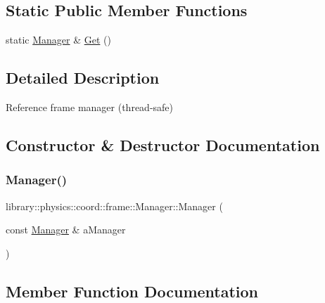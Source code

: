\subsection*{Static Public Member Functions}
\begin{DoxyCompactItemize}
\item 
static \hyperlink{classlibrary_1_1physics_1_1coord_1_1frame_1_1_manager}{Manager} \& \hyperlink{classlibrary_1_1physics_1_1coord_1_1frame_1_1_manager_ab17540188339548c7235a21236f8118e}{Get} ()
\end{DoxyCompactItemize}


\subsection{Detailed Description}
Reference frame manager (thread-\/safe) 

\subsection{Constructor \& Destructor Documentation}
\mbox{\label{classlibrary_1_1physics_1_1coord_1_1frame_1_1_manager_a2a044628916a829eeaf4da33c2b187b3}} 
\subsubsection{\texorpdfstring{Manager()}{Manager()}}
{\footnotesize\ttfamily library\+::physics\+::coord\+::frame\+::\+Manager\+::\+Manager (\begin{DoxyParamCaption}\item[{const \hyperlink{classlibrary_1_1physics_1_1coord_1_1frame_1_1_manager}{Manager} \&}]{a\+Manager }\end{DoxyParamCaption})\hspace{0.3cm}{\ttfamily [delete]}}



\subsection{Member Function Documentation}
\mbox{\label{classlibrary_1_1physics_1_1coord_1_1frame_1_1_manager_a0754fdf8670d625254c5acac8367a81e}} 

